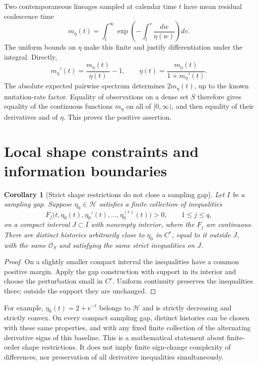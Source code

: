 \documentclass[11pt]{article}
\newtheorem{corollary}[theorem]{Corollary}
\theoremstyle{definition}
\theoremstyle{remark}
\numberwithin{equation}{section}
\begin{document}
Two contemporaneous lineages sampled at calendar time $t$ have mean
residual coalescence time
\[
 m_\eta(t)=\int_t^\infty
       \exp\left(-\int_t^v\frac{dw}{\eta(w)}\right)dv.
\]
The uniform bounds on $\eta$ make this finite and justify
differentiation under the integral. Directly,
\[
                 m_\eta'(t)=\frac{m_\eta(t)}{\eta(t)}-1,
 \qquad
                 \eta(t)=\frac{m_\eta(t)}{1+m_\eta'(t)}.
\]
The absolute expected pairwise spectrum determines $2m_\eta(t)$,
up to the known mutation-rate factor. Equality of observations on
a dense set $S$ therefore gives equality of the continuous functions
$m_\eta$ on all of $[0,\infty)$, and then equality of their derivatives
and of $\eta$. This proves the positive assertion.



\section{Local shape constraints and information boundaries}
\label{sec:consequences}

\begin{corollary}[Strict shape restrictions do not close a sampling gap]
\label{cor:shape}
Let $I$ be a sampling gap. Suppose $\eta_0\in\mathcal H$ satisfies
a finite collection of inequalities
\[
 F_j\bigl(t,\eta_0(t),\eta_0'(t),\ldots,\eta_0^{(r)}(t)\bigr)>0,
 \qquad 1\le j\le q,
\]
on a compact interval $J\subset I$ with nonempty interior, where the
$F_j$ are continuous. There are distinct histories arbitrarily close
to $\eta_0$ in $C^r$, equal to it outside $J$, with the same
$\mathcal O_S$ and satisfying the same strict inequalities on $J$.
\end{corollary}
\begin{proof}
On a slightly smaller compact interval the inequalities have a common
positive margin. Apply the gap construction with support in its interior
and choose the perturbation small in $C^r$. Uniform continuity preserves
the inequalities there; outside the support they are unchanged.
\end{proof}

For example, $\eta_0(t)=2+e^{-t}$ belongs to $\mathcal H$ and is strictly
decreasing and strictly convex. On every compact sampling gap, distinct
histories can be chosen with these same properties, and with any fixed
finite collection of the alternating derivative signs of this baseline.
This is a mathematical statement about finite-order shape restrictions.
It does not imply finite sign-change complexity of differences, nor
preservation of all derivative inequalities simultaneously.
\end{document}
